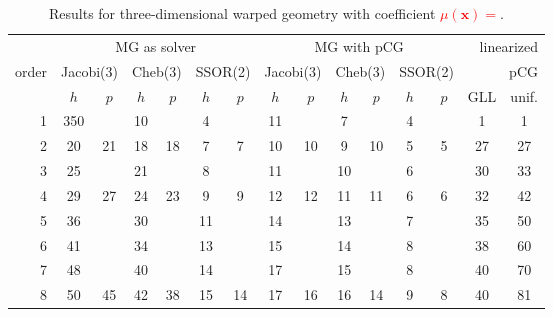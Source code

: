 \documentclass[smallcondensed,final]{svjour3}     %
\newcommand{\todo}[1]{\textcolor{red}{\bf #1}}
\newcommand{\bs}[1]{\ensuremath{\boldsymbol #1}}
\begin{document}
\begin{table}
  \caption{\label{tab:3d-fan} Results for three-dimensional warped geometry
    with coefficient \todo{$\mu(\bs x)=$}.}
  \centering
  \begin{tabular}{|r|c c|c c|c c||c c|c c|c c||c c|} 
    \hline
    & \multicolumn{6}{c||}{MG as solver} & \multicolumn{6}{c||}{MG with pCG} & \multicolumn{2}{r|}{linearized} \\
    \cline{2-13}
    \!\!\! order \!\!\!\! &  \multicolumn{2}{c|}{\!\scriptsize  Jacobi(3)\!} &  \multicolumn{2}{c|}{\!\scriptsize Cheb(3)\!} & \multicolumn{2}{c||}{\!\scriptsize  SSOR(2)\!} & \multicolumn{2}{c|}{\!\scriptsize Jacobi(3)\!} &  \multicolumn{2}{c|}{\!\scriptsize Cheb(3)\!} & \multicolumn{2}{c||}{\!\scriptsize SSOR(2)\!} & \multicolumn{2}{r|}{pCG}\\
\hline
 & $h$ & $p$ & $h$ & $p$& $h$ & $p$& $h$ & $p$& $h$ & $p$& $h$ & $p$& GLL & unif.\\
 \cline{2-15}
1 & 350 & & 10 & & 4 & & 11 & & 7 & & 4 & & 1 & 1  \\
2 & 20 & 21 & 18 & 18 & 7 & 7 & 10 & 10 & 9 & 10 & 5 & 5 & 27 & 27 \\
3 & 25 & & 21 & & 8 & & 11 & & 10 & & 6 & & 30 & 33  \\
4 & 29 & 27 & 24 & 23 & 9 & 9 & 12 & 12 & 11 & 11 & 6 & 6 & 32 & 42 \\
5 & 36 & & 30 & & 11 & & 14 & & 13 & & 7 & & 35 & 50  \\
6 & 41 & & 34 & & 13 & & 15 & & 14 & & 8 & & 38 & 60  \\
7 & 48 & & 40 & & 14 & & 17 & & 15 & & 8 & & 40 & 70  \\
8 & 50 & 45 & 42 & 38 & 15 & 14 & 17 & 16 & 16 & 14 & 9 & 8 & 40 & 81 \\
\hline
  \end{tabular}
\end{table}
\end{document}
